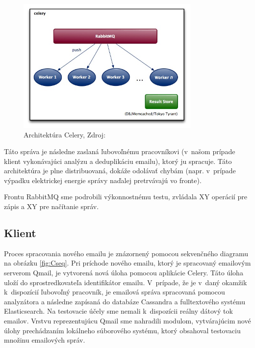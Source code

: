 \documentclass[11pt,twoside,a4paper]{book}
\begin{document}
\begin{figure}[h]
 \centering
 \includegraphics[width=9cm]{./figures/Celery.jpg}
 \caption{Architektúra Celery, Zdroj: \cite{celery}}
 \label{fig:Celery}
\end{figure}
Táto správa je následne zaslaná ľubovoľnému pracovníkovi (v~našom prípade klient vykonávajúci analýzu a deduplikáciu emailu), ktorý ju spracuje. Táto architektúra je plne distribuovaná, dokáže odolávať chybám (napr. v~prípade výpadku elektrickej energie správy naďalej pretrvávajú vo fronte).


Frontu RabbitMQ sme podrobili výkonnostnému testu, zvládala XY operácií pre zápis a XY pre načítanie správ.

\subsection{Klient}

Proces spracovania nového emailu je znázornený pomocou sekvenčného diagramu na obrázku \ref{fig:Cseq}. Pri príchode nového emailu, ktorý je spracovaný emailovým serverom Qmail, je vytvorená nová úloha pomocou aplikácie Celery. Táto úloha uloží do sprostredkovateľa identifikátor emailu. V~prípade, že je v~daný okamžik k~dispozícií ľubovoľný pracovník, je emailová správa spracovaná pomocou analyzátora a následne zapísaná do databáze Cassandra a fulltextového systému Elasticsearch. Na testovacie účely sme nemali k~dispozícii reálny dátový tok emailov. Vrstvu reprezentujúcu Qmail sme nahradili modulom, vytvárajúcim nové úlohy prechádzaním lokálneho súborového systému, ktorý obsahoval testovaciu množinu emailových správ.
\end{document}
